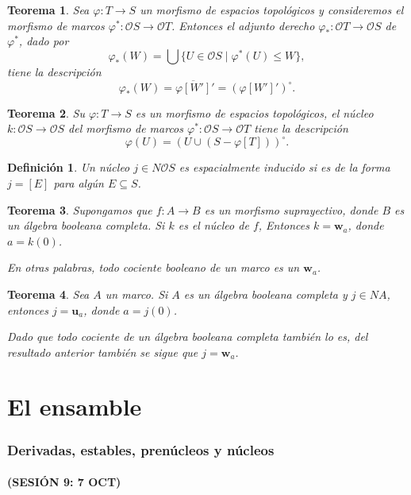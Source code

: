 \documentclass[12pt,letterpaper,titlepage]{article}
\newtheorem*{defn}{Definición}
\newtheorem*{thm}{Teorema}
\theoremstyle{definition}
\newcommand\ol[1]{\overline{#1}}
\renewcommand\phi{\varphi}
\renewcommand\cal[1]{\mathcal{#1}}
\newcommand\unuc[1]{\mathbf u_{#1}}
\newcommand\wnuc[1]{\mathbf w_{#1}}
\newcommand\<{\langle}
\renewcommand\>{\rangle}
\begin{document}
\begin{thm}
  Sea $\phi:T\to S$ un morfismo de espacios topológicos y
  consideremos el morfismo de marcos
  $\phi^*:\cal OS\to\cal OT$.
  Entonces el adjunto derecho $\phi_*:\cal OT \to \cal OS$
  de $\phi^*$, dado por
  \[
    \phi_*(W)
    = \bigcup\{U\in\cal OS \mid \phi^*(U) \leq W\}
  ,\]
  tiene la descripción
  \[
    \phi_*(W) = \ol{\phi[W']}' = (\phi[W']')^\circ
  .\]
\end{thm}

\begin{thm}
  Su $\phi:T\to S$ es un morfismo de espacios topológicos,
  el núcleo $k:\cal OS\to\cal OS$ del morfismo de marcos
  $\phi^*:\cal OS\to\cal OT$ tiene la descripción
  \[
    \phi(U) = (U\cup (S-\phi[T]))^\circ
  .\]
\end{thm}

\begin{defn}
  Un núcleo $j\in N\cal O S$ es \emph{espacialmente
  inducido} si es de la forma $j=[E]$ para algún
  $E\subseteq S$.
\end{defn}

\begin{thm}
  Supongamos que $f:A\to B$ es un morfismo suprayectivo,
  donde $B$ es un álgebra booleana completa.
  Si $k$ es el núcleo de $f$,
  Entonces $k=\wnuc a$, donde $a=k(0)$.
  
  En otras palabras, todo cociente booleano de un marco
  es un $\wnuc a$.
\end{thm}

\begin{thm}
  Sea $A$ un marco.
  Si $A$ es un álgebra booleana completa y $j\in NA$,
  entonces $j=\unuc a$, donde $a=j(0)$.
  
  Dado que todo cociente de un álgebra booleana completa
  también lo es, del resultado anterior también se sigue
  que $j=\wnuc a$.
\end{thm}

\part{El ensamble}

\section{Derivadas, estables, prenúcleos y núcleos}

\subsection*{(SESIÓN 9: 7 OCT)}
\end{document}
